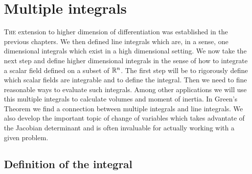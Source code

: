 \chapter{Multiple integrals}

\lettrine{T}{he} extension to higher dimension of differentiation was established in the previous chapters.
We then defined line integrals which are, in a sense, one dimensional integrals which exist in a high dimensional setting.
We now take the next step and define higher dimensional integrals in the sense of how to integrate a scalar field defined on a subset of \(\mathbb{R}^n\).
The first step will be to rigorously define which scalar fields are integrable and to define the integral.
Then we need to fine reasonable ways to evaluate such integrals.
Among other applications we will use this multiple integrals to calculate volumes and moment of inertia.
In Green's Theorem we find a connection between multiple integrals and line integrals.
We also develop the important topic of change of variables which takes advantate of the Jacobian determinant and is often invaluable for actually working with a given problem.

\section{Definition of the integral}

